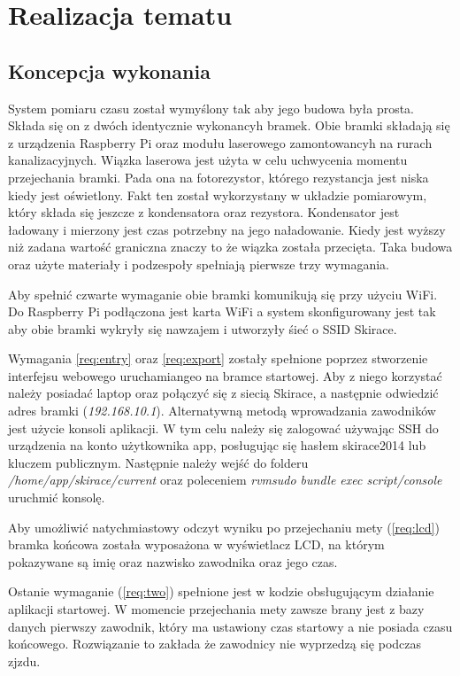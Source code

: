 \documentclass[11pt,a4paper, twoside]{article}
\begin{document}
\section{Realizacja tematu}
\subsection{Koncepcja wykonania}\label{concept}
System pomiaru czasu został wymyślony tak aby jego budowa była prosta. Składa się on z dwóch identycznie wykonancyh bramek. Obie bramki składają się z urządzenia Raspberry Pi oraz modułu laserowego zamontowancyh na rurach kanalizacyjnych. Wiązka laserowa jest użyta w celu uchwycenia momentu przejechania bramki. Pada ona na fotorezystor, którego rezystancja jest niska kiedy jest oświetlony. Fakt ten został wykorzystany w układzie pomiarowym, który składa się jeszcze z kondensatora oraz rezystora. Kondensator jest ładowany i mierzony jest czas potrzebny na jego naładowanie. Kiedy jest wyższy niż zadana wartość graniczna znaczy to że wiązka została przecięta. Taka budowa oraz użyte materiały i podzespoły spełniają pierwsze trzy wymagania.

Aby spełnić czwarte wymaganie obie bramki komunikują się przy użyciu WiFi. Do Raspberry Pi podłączona jest karta WiFi a system skonfigurowany jest tak aby obie bramki wykryły się nawzajem i utworzyły śieć o SSID Skirace.

Wymagania \ref{req:entry} oraz \ref{req:export} zostały spełnione poprzez stworzenie interfejsu webowego uruchamiangeo na bramce startowej. Aby z niego korzystać należy posiadać laptop oraz połączyć się z siecią Skirace, a następnie odwiedzić adres bramki (\emph{192.168.10.1}). Alternatywną metodą wprowadzania zawodników jest użycie konsoli aplikacji. W tym celu należy się zalogować używając SSH do urządzenia na konto użytkownika app, posługując się hasłem skirace2014 lub kluczem publicznym. Następnie należy wejść do folderu \emph{/home/app/skirace/current} oraz poleceniem \emph{rvmsudo bundle exec script/console} uruchmić konsolę. 

Aby umożliwić natychmiastowy odczyt wyniku po przejechaniu mety (\ref{req:lcd}) bramka końcowa została wyposażona w wyświetlacz LCD, na którym pokazywane są imię oraz nazwisko zawodnika oraz jego czas. 

Ostanie wymaganie (\ref{req:two}) spełnione jest w kodzie obsługującym działanie aplikacji startowej. W momencie przejechania mety zawsze brany jest z bazy danych pierwszy zawodnik, który ma ustawiony czas startowy a nie posiada czasu końcowego. Rozwiązanie to zakłada że zawodnicy nie wyprzedzą się podczas zjzdu.
\end{document}
